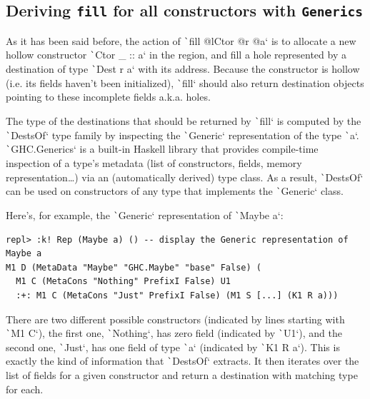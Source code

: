 \documentclass[english]{jflart}
\begin{document}
\subsection{Deriving \texttt{fill} for all constructors with \texttt{Generics}}


As it has been said before, the action of \texttt`fill @lCtor @r @a` is to allocate a new hollow constructor \texttt`Ctor _ :: a` in the region, and fill a hole represented by a destination of type \texttt`Dest r a` with its address. Because the constructor is hollow (i.e. its fields haven't been initialized), \texttt`fill` should also return destination objects pointing to these incomplete fields a.k.a. holes.

The type of the destinations that should be returned by \texttt`fill` is computed by the \texttt`DestsOf` type family by inspecting the \texttt`Generic` representation of the type \texttt`a`. \texttt`GHC.Generics` is a built-in Haskell library that provides compile-time inspection of a type's metadata (list of constructors, fields, memory representation\ldots) via an (automatically derived) type class. As a result, \texttt`DestsOf` can be used on constructors of any type that implements the \texttt`Generic` class.

Here's, for example, the \texttt`Generic` representation of \texttt`Maybe a`:

{\small
\begin{verbatim}
repl> :k! Rep (Maybe a) () -- display the Generic representation of Maybe a
M1 D (MetaData "Maybe" "GHC.Maybe" "base" False) (
  M1 C (MetaCons "Nothing" PrefixI False) U1
  :+: M1 C (MetaCons "Just" PrefixI False) (M1 S [...] (K1 R a)))
\end{verbatim}
}

There are two different possible constructors (indicated by lines starting with \texttt`M1 C`), the first one, \texttt`Nothing`, has zero field (indicated by \texttt`U1`), and the second one, \texttt`Just`, has one field of type \texttt`a` (indicated by \texttt`K1 R a`). This is exactly the kind of information that \texttt`DestsOf` extracts. It then iterates over the list of fields for a given constructor and return a destination with matching type for each.
\end{document}
